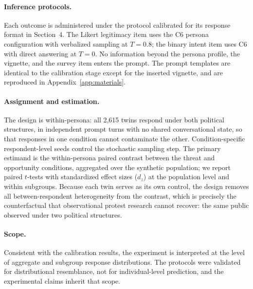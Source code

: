 \paragraph{Inference protocols.} Each outcome is administered under the
protocol calibrated for its response format in Section~4. The Likert
legitimacy item uses the C6 persona configuration with verbalized sampling
at $T=0.8$; the binary intent item uses C6 with direct answering at $T=0$.
No information beyond the persona profile, the vignette, and the survey item
enters the prompt. The prompt templates are identical to the calibration
stage except for the inserted vignette, and are reproduced in
Appendix~\ref{app:materials}.

\paragraph{Assignment and estimation.} The design is within-persona: all
2{,}615 twins respond under both political structures, in independent prompt
turns with no shared conversational state, so that responses in one
condition cannot contaminate the other. Condition-specific respondent-level
seeds control the stochastic sampling step. The primary estimand is the
within-persona paired contrast between the threat and opportunity
conditions, aggregated over the synthetic population; we report paired
$t$-tests with standardized effect sizes ($d_z$) at the population level and
within subgroups. Because each twin serves as its own control, the design
removes all between-respondent heterogeneity from the contrast, which is
precisely the counterfactual that observational protest research cannot
recover: the same public observed under two political structures.

\paragraph{Scope.} Consistent with the calibration results, the experiment
is interpreted at the level of aggregate and subgroup response
distributions. The protocols were validated for distributional resemblance,
not for individual-level prediction, and the experimental claims inherit
that scope.
